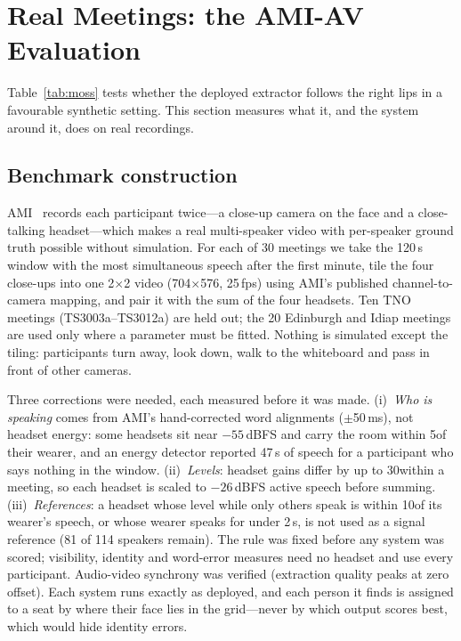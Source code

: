 \section{Real Meetings: the AMI-AV Evaluation}
\label{sec:amiav}

Table~\ref{tab:moss} tests whether the deployed extractor follows the right lips in a favourable synthetic setting. This section measures what it, and the system around it, does on real recordings.

\subsection{Benchmark construction}
AMI~\cite{carletta2005ami} records each participant twice---a close-up camera on the face and a close-talking headset---which makes a real multi-speaker video with per-speaker ground truth possible without simulation. For each of 30 meetings we take the 120\,s window with the most simultaneous speech after the first minute, tile the four close-ups into one 2$\times$2 video (704$\times$576, 25\,fps) using AMI's published channel-to-camera mapping, and pair it with the sum of the four headsets. Ten TNO meetings (TS3003a--TS3012a) are held out; the 20 Edinburgh and Idiap meetings are used only where a parameter must be fitted. Nothing is simulated except the tiling: participants turn away, look down, walk to the whiteboard and pass in front of other cameras.

Three corrections were needed, each measured before it was made. (i)~\emph{Who is speaking} comes from AMI's hand-corrected word alignments ($\pm$50\,ms), not headset energy: some headsets sit near $-55$\,dBFS and carry the room within 5\dB of their wearer, and an energy detector reported 47\,s of speech for a participant who says nothing in the window. (ii)~\emph{Levels}: headset gains differ by up to 30\dB within a meeting, so each headset is scaled to $-26$\,dBFS active speech before summing. (iii)~\emph{References}: a headset whose level while only others speak is within 10\dB of its wearer's speech, or whose wearer speaks for under 2\,s, is not used as a signal reference (81 of 114 speakers remain). The rule was fixed before any system was scored; visibility, identity and word-error measures need no headset and use every participant. Audio-video synchrony was verified (extraction quality peaks at zero offset). Each system runs exactly as deployed, and each person it finds is assigned to a seat by where their face lies in the grid---never by which output scores best, which would hide identity errors.

